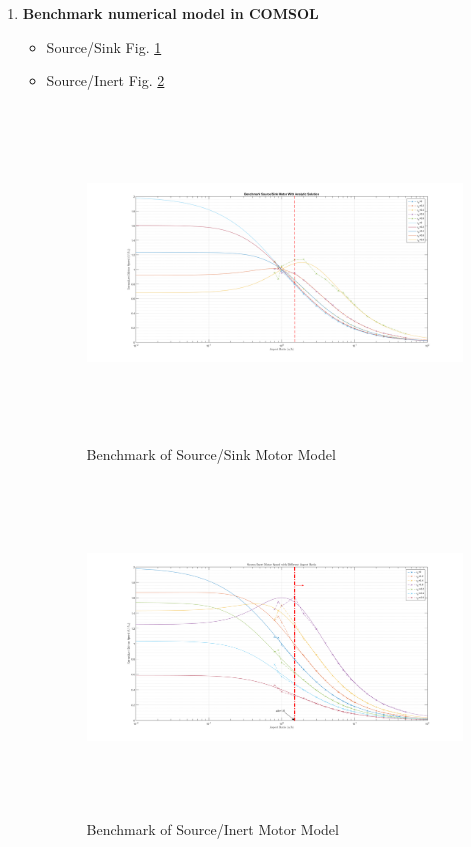 \documentclass[fontsize=11pt, %
                             paper=a4, %
                             twoside, %
                             captions=tableheading,
                             index=totoc,
                             hyperref]{labbook}
\begin{document}
\begin{enumerate}
\item \textbf{Benchmark numerical model in COMSOL}\\
\begin{itemize}
\item Source/Sink Fig. \ref{2016-12-18-BSSMM}
\item Source/Inert Fig. \ref{2016-12-18-BSIMM}
\begin{figure}
\centering
\includegraphics[width=\linewidth, height=3.5in]{2016-12-25-Benchmark_SourceSink_Free.png}
\caption{Benchmark of Source/Sink Motor Model}\label{2016-12-18-BSSMM}
\end{figure}
\begin{figure}
\centering
\includegraphics[width=\linewidth, height=3.5in]{2016-12-18-Benchmark_SourceInert_Free.png}
\caption{Benchmark of Source/Inert Motor Model}\label{2016-12-18-BSIMM}

\end{figure}
\end{itemize}
\end{enumerate}
\end{document}
